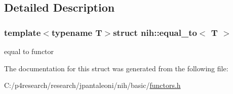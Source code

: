 \subsection{\-Detailed \-Description}
\subsubsection*{template$<$typename T$>$struct nih\-::equal\-\_\-to$<$ T $>$}

equal to functor 

\-The documentation for this struct was generated from the following file\-:\begin{DoxyCompactItemize}
\item 
\-C\-:/p4research/research/jpantaleoni/nih/basic/\hyperlink{functors_8h}{functors.\-h}\end{DoxyCompactItemize}
